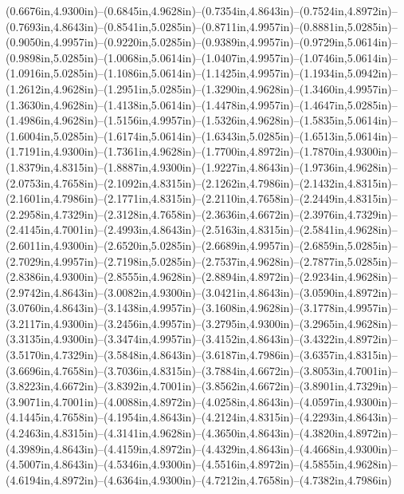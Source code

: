 (0.6676in,4.9300in)--(0.6845in,4.9628in)--(0.7354in,4.8643in)--(0.7524in,4.8972in)--(0.7693in,4.8643in)--(0.8541in,5.0285in)--(0.8711in,4.9957in)--(0.8881in,5.0285in)--(0.9050in,4.9957in)--(0.9220in,5.0285in)--(0.9389in,4.9957in)--(0.9729in,5.0614in)--(0.9898in,5.0285in)--(1.0068in,5.0614in)--(1.0407in,4.9957in)--(1.0746in,5.0614in)--(1.0916in,5.0285in)--(1.1086in,5.0614in)--(1.1425in,4.9957in)--(1.1934in,5.0942in)--(1.2612in,4.9628in)--(1.2951in,5.0285in)--(1.3290in,4.9628in)--(1.3460in,4.9957in)--(1.3630in,4.9628in)--(1.4138in,5.0614in)--(1.4478in,4.9957in)--(1.4647in,5.0285in)--(1.4986in,4.9628in)--(1.5156in,4.9957in)--(1.5326in,4.9628in)--(1.5835in,5.0614in)--(1.6004in,5.0285in)--(1.6174in,5.0614in)--(1.6343in,5.0285in)--(1.6513in,5.0614in)--(1.7191in,4.9300in)--(1.7361in,4.9628in)--(1.7700in,4.8972in)--(1.7870in,4.9300in)--(1.8379in,4.8315in)--(1.8887in,4.9300in)--(1.9227in,4.8643in)--(1.9736in,4.9628in)--(2.0753in,4.7658in)--(2.1092in,4.8315in)--(2.1262in,4.7986in)--(2.1432in,4.8315in)--(2.1601in,4.7986in)--(2.1771in,4.8315in)--(2.2110in,4.7658in)--(2.2449in,4.8315in)--(2.2958in,4.7329in)--(2.3128in,4.7658in)--(2.3636in,4.6672in)--(2.3976in,4.7329in)--(2.4145in,4.7001in)--(2.4993in,4.8643in)--(2.5163in,4.8315in)--(2.5841in,4.9628in)--(2.6011in,4.9300in)--(2.6520in,5.0285in)--(2.6689in,4.9957in)--(2.6859in,5.0285in)--(2.7029in,4.9957in)--(2.7198in,5.0285in)--(2.7537in,4.9628in)--(2.7877in,5.0285in)--(2.8386in,4.9300in)--(2.8555in,4.9628in)--(2.8894in,4.8972in)--(2.9234in,4.9628in)--(2.9742in,4.8643in)--(3.0082in,4.9300in)--(3.0421in,4.8643in)--(3.0590in,4.8972in)--(3.0760in,4.8643in)--(3.1438in,4.9957in)--(3.1608in,4.9628in)--(3.1778in,4.9957in)--(3.2117in,4.9300in)--(3.2456in,4.9957in)--(3.2795in,4.9300in)--(3.2965in,4.9628in)--(3.3135in,4.9300in)--(3.3474in,4.9957in)--(3.4152in,4.8643in)--(3.4322in,4.8972in)--(3.5170in,4.7329in)--(3.5848in,4.8643in)--(3.6187in,4.7986in)--(3.6357in,4.8315in)--(3.6696in,4.7658in)--(3.7036in,4.8315in)--(3.7884in,4.6672in)--(3.8053in,4.7001in)--(3.8223in,4.6672in)--(3.8392in,4.7001in)--(3.8562in,4.6672in)--(3.8901in,4.7329in)--(3.9071in,4.7001in)--(4.0088in,4.8972in)--(4.0258in,4.8643in)--(4.0597in,4.9300in)--(4.1445in,4.7658in)--(4.1954in,4.8643in)--(4.2124in,4.8315in)--(4.2293in,4.8643in)--(4.2463in,4.8315in)--(4.3141in,4.9628in)--(4.3650in,4.8643in)--(4.3820in,4.8972in)--(4.3989in,4.8643in)--(4.4159in,4.8972in)--(4.4329in,4.8643in)--(4.4668in,4.9300in)--(4.5007in,4.8643in)--(4.5346in,4.9300in)--(4.5516in,4.8972in)--(4.5855in,4.9628in)--(4.6194in,4.8972in)--(4.6364in,4.9300in)--(4.7212in,4.7658in)--(4.7382in,4.7986in)

